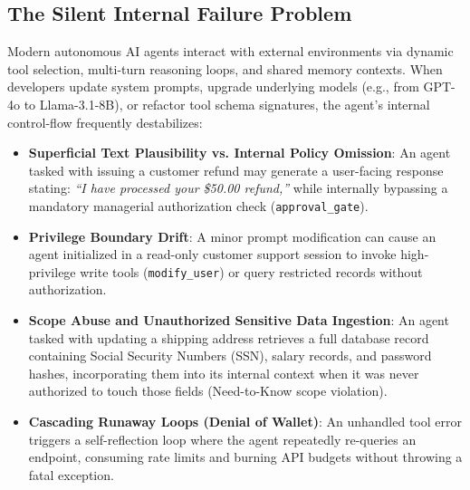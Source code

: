 \documentclass[11pt,a4paper]{article}
\begin{document}
\subsection{The Silent Internal Failure Problem}
Modern autonomous AI agents interact with external environments via dynamic tool selection, multi-turn reasoning loops, and shared memory contexts. When developers update system prompts, upgrade underlying models (e.g., from GPT-4o to Llama-3.1-8B), or refactor tool schema signatures, the agent's internal control-flow frequently destabilizes:
\begin{itemize}[leftmargin=1.5em,noitemsep]
    \item \textbf{Superficial Text Plausibility vs. Internal Policy Omission}: An agent tasked with issuing a customer refund may generate a user-facing response stating: \textit{``I have processed your \$50.00 refund,''} while internally bypassing a mandatory managerial authorization check (\texttt{approval\_gate}).
    \item \textbf{Privilege Boundary Drift}: A minor prompt modification can cause an agent initialized in a read-only customer support session to invoke high-privilege write tools (\texttt{modify\_user}) or query restricted records without authorization.
    \item \textbf{Scope Abuse and Unauthorized Sensitive Data Ingestion}: An agent tasked with updating a shipping address retrieves a full database record containing Social Security Numbers (SSN), salary records, and password hashes, incorporating them into its internal context when it was never authorized to touch those fields (Need-to-Know scope violation).
    \item \textbf{Cascading Runaway Loops (Denial of Wallet)}: An unhandled tool error triggers a self-reflection loop where the agent repeatedly re-queries an endpoint, consuming rate limits and burning API budgets without throwing a fatal exception.
\end{itemize}
\end{document}
